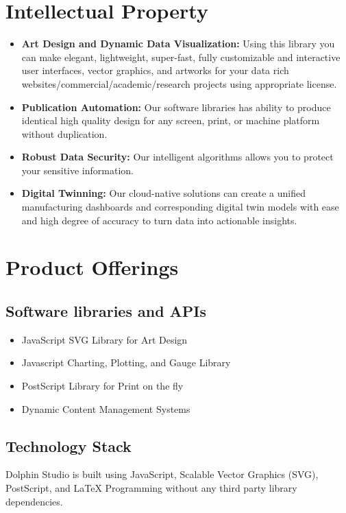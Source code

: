 \documentclass{amm-pst-report}
\begin{document}
\section{Intellectual Property}
\begin{itemize}[itemsep=10pt]

\item \textbf{Art Design and Dynamic Data Visualization:} Using this library you can make elegant, lightweight, super-fast, fully customizable and interactive user interfaces, vector graphics, and artworks for your data rich websites/commercial/academic/research projects using appropriate license.

\item \textbf{Publication Automation:} Our software libraries has ability to produce identical high quality design for any screen, print, or machine platform without duplication.

\item \textbf{Robust Data Security:} Our intelligent algorithms allows you to protect your sensitive information.

\item \textbf{Digital Twinning:} Our cloud-native solutions can create a unified  manufacturing dashboards and corresponding digital twin models with ease and high degree of accuracy to turn data into actionable insights.

\end{itemize}



\section{Product Offerings}
\subsection{Software libraries and APIs}
\begin{itemize}
\item JavaScript SVG Library for Art Design
\item Javascript Charting, Plotting, and Gauge Library
\item PostScript Library for Print on the fly
\item Dynamic Content Management Systems
\end{itemize}

\subsection{Technology Stack}
Dolphin Studio is built using JavaScript, Scalable Vector Graphics (SVG), PostScript, and LaTeX Programming without any third party library dependencies.
\end{document}
